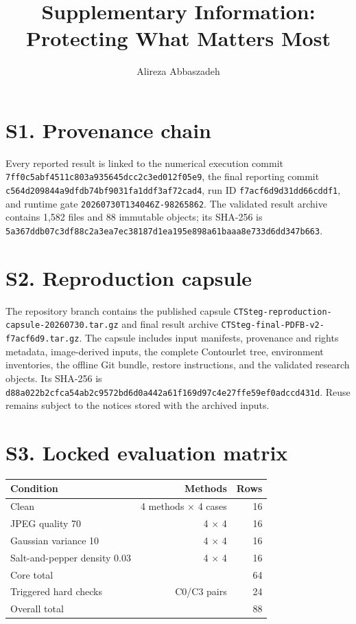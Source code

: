 \documentclass[10pt]{article}
\title{Supplementary Information: Protecting What Matters Most}
\author{Alireza Abbaszadeh}
\date{}
\begin{document}
\maketitle
\section*{S1. Provenance chain}
Every reported result is linked to the numerical execution commit \texttt{7ff0c5abf4511c803a935645dcc2c3ed012f05e9}, the final reporting commit \texttt{c564d209844a9dfdb74bf9031fa1ddf3af72cad4}, run ID \texttt{f7acf6d9d31dd66cddf1}, and runtime gate \texttt{20260730T134046Z-98265862}. The validated result archive contains 1,582 files and 88 immutable objects; its SHA-256 is \texttt{5a367ddb07c3df88c2a3ea7ec38187d1ea195e898a61baaa8e733d6dd347b663}.

\section*{S2. Reproduction capsule}
The repository branch contains the published capsule \texttt{CTSteg-reproduction-capsule-20260730.tar.gz} and final result archive \texttt{CTSteg-final-PDFB-v2-f7acf6d9.tar.gz}. The capsule includes input manifests, provenance and rights metadata, image-derived inputs, the complete Contourlet tree, environment inventories, the offline Git bundle, restore instructions, and the validated research objects. Its SHA-256 is \texttt{d88a022b2cfca54ab2c9572bd6d0a442a61f169d97c4e27ffe59ef0adccd431d}. Reuse remains subject to the notices stored with the archived inputs.

\section*{S3. Locked evaluation matrix}
\begin{center}
\begin{tabular}{lrr}
\toprule
Condition & Methods & Rows\\
\midrule
Clean & 4 methods $\times$ 4 cases & 16\\
JPEG quality 70 & 4 $\times$ 4 & 16\\
Gaussian variance 10 & 4 $\times$ 4 & 16\\
Salt-and-pepper density 0.03 & 4 $\times$ 4 & 16\\
Core total & & 64\\
Triggered hard checks & C0/C3 pairs & 24\\
Overall total & & 88\\
\bottomrule
\end{tabular}
\end{center}
\end{document}
